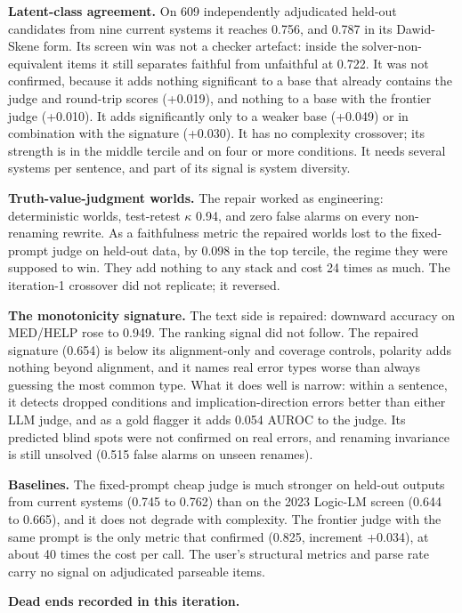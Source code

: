 \documentclass[11pt,letterpaper]{article}
\begin{document}
\textbf{Latent-class agreement.} On 609 independently adjudicated held-out candidates from nine current systems it reaches 0.756, and 0.787 in its Dawid-Skene form. Its screen win was not a checker artefact: inside the solver-non-equivalent items it still separates faithful from unfaithful at 0.722. It was not confirmed, because it adds nothing significant to a base that already contains the judge and round-trip scores (+0.019), and nothing to a base with the frontier judge (+0.010). It adds significantly only to a weaker base (+0.049) or in combination with the signature (+0.030). It has no complexity crossover; its strength is in the middle tercile and on four or more conditions. It needs several systems per sentence, and part of its signal is system diversity.

\textbf{Truth-value-judgment worlds.} The repair worked as engineering: deterministic worlds, test-retest $\kappa$ 0.94, and zero false alarms on every non-renaming rewrite. As a faithfulness metric the repaired worlds lost to the fixed-prompt judge on held-out data, by 0.098 in the top tercile, the regime they were supposed to win. They add nothing to any stack and cost 24 times as much. The iteration-1 crossover did not replicate; it reversed.

\textbf{The monotonicity signature.} The text side is repaired: downward accuracy on MED/HELP rose to 0.949. The ranking signal did not follow. The repaired signature (0.654) is below its alignment-only and coverage controls, polarity adds nothing beyond alignment, and it names real error types worse than always guessing the most common type. What it does well is narrow: within a sentence, it detects dropped conditions and implication-direction errors better than either LLM judge, and as a gold flagger it adds 0.054 AUROC to the judge. Its predicted blind spots were not confirmed on real errors, and renaming invariance is still unsolved (0.515 false alarms on unseen renames).

\textbf{Baselines.} The fixed-prompt cheap judge is much stronger on held-out outputs from current systems (0.745 to 0.762) than on the 2023 Logic-LM screen (0.644 to 0.665), and it does not degrade with complexity. The frontier judge with the same prompt is the only metric that confirmed (0.825, increment +0.034), at about 40 times the cost per call. The user's structural metrics and parse rate carry no signal on adjudicated parseable items.

\textbf{Dead ends recorded in this iteration.}
\end{document}
